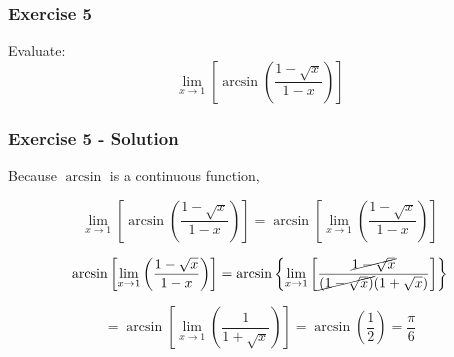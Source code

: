 \documentclass[12pt]{beamer}
\begin{document}
\begin{frame}
	\frametitle{Exercise 5}
	\Large
	Evaluate: \[\displaystyle\lim_{x\to1}\left[\arcsin\left(\frac{1-\sqrt{x}}{1-x}\right)\right]\]\par
\end{frame}
\begin{frame}
	\frametitle{Exercise 5 - Solution}
	Because $\arcsin$ is a continuous function,\par
	\[\displaystyle\lim_{x\to1}\left[\arcsin\left(\frac{1-\sqrt{x}}{1-x}\right)\right]=\arcsin\left[\displaystyle\lim_{x\to1}\left(\frac{1-\sqrt{x}}{1-x}\right)\right]\]\par
	\[\arcsin\left[\displaystyle\lim_{x\to1}\left(\frac{1-\sqrt{x}}{1-x}\right)\right]=\arcsin\left\{\displaystyle\lim_{x\to1}\left[\frac{\cancel{1-\sqrt{x}}}{\cancel{(1-\sqrt{x})}(1+\sqrt{x})}\right]\right\}\]\par
	\[=\arcsin\left[\displaystyle\lim_{x\to1}\left(\frac{1}{1+\sqrt{x}}\right)\right]=\arcsin\left(\frac{1}{2}\right)=\boxed{\frac{\pi}{6}}\]
\end{frame}
\end{document}
